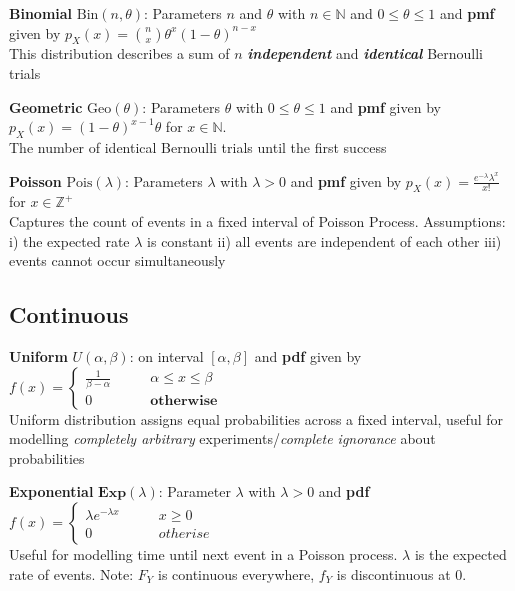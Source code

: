\documentclass[5pt]{article}
\begin{document}
\begin{definition}
\textbf{Binomial} $\text{Bin}(n,\theta)$: Parameters $n$ and $\theta$ with $n \in \mathbb{N}$ and $0 \leq \theta \leq 1$ and \textbf{pmf} given by $p_X(x) = {n \choose x}\theta^x(1-\theta)^{n-x}$\\
This distribution describes a sum of $n$ \emph{\textbf{independent}} and \emph{\textbf{identical}} Bernoulli trials
\end{definition}

\begin{definition}
\textbf{Geometric} $\text{Geo}(\theta)$: Parameters $\theta$ with $0 \leq \theta \leq 1$ and \textbf{pmf} given by $p_X(x) = (1-\theta)^{x-1} \theta$ for $x \in \mathbb{N}.$\\
The number of identical Bernoulli trials until the first success
\end{definition}

\begin{definition} 
\textbf{Poisson} $\text{Pois}(\lambda)$: Parameters $\lambda$ with $\lambda > 0$ and \textbf{pmf} given by $p_X(x) = \frac{e^{-\lambda}\lambda^x}{x!}$ for $x \in \mathbb{Z}^+$\\
Captures the count of events in a fixed interval of Poisson Process. Assumptions: i) the expected rate $\lambda$ is constant ii) all events are independent of each other iii) events cannot occur simultaneously
\end{definition}

\subsection{Continuous}
\begin{definition}
\textbf{Uniform} $U(\alpha,\beta)$: on interval $[\alpha,\beta]$ and \textbf{pdf} given by $f(x) = \begin{cases}
\frac{1}{\beta - \alpha} \qquad & \alpha \leq x \leq \beta\\
0 &\textbf{otherwise}
\end{cases}$\\
Uniform distribution assigns equal probabilities across a fixed interval, useful for modelling \emph{completely arbitrary} experiments/\emph{complete ignorance} about probabilities
\end{definition}

\begin{definition}
\textbf{Exponential} $\textbf{Exp}(\lambda)$: Parameter $\lambda$ with $\lambda > 0$ and \textbf{pdf} $f(x) = \begin{cases}
\lambda e^{-\lambda x} \qquad & x \geq 0\\
0 &otherise
\end{cases}$\\
Useful for modelling time until next event in a Poisson process. $\lambda$ is the expected rate of events. Note: $F_Y$ is continuous everywhere, $f_Y$ is discontinuous at 0.
\end{definition}
\end{document}
